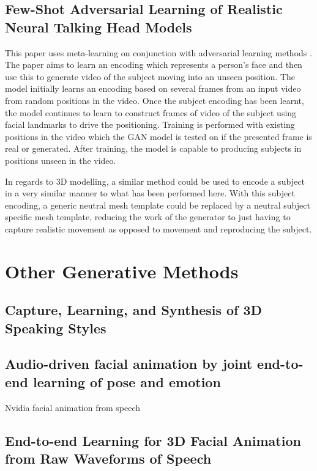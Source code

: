 \documentclass[12pt]{article}
\begin{document}
\subsection{Few-Shot Adversarial Learning of Realistic Neural Talking Head Models}
This paper uses meta-learning on conjunction with adversarial learning methods \cite{Zakharov2019}.
The paper aims to learn an encoding which represents a person's face and then use this to generate video of the subject moving into an unseen position.
The model initially learns an encoding based on several frames from an input video from random positions in the video.
Once the subject encoding has been learnt, the model continues to learn to construct frames of video of the subject using facial landmarks to drive the positioning.
Training is performed with existing positions in the video which the GAN model is tested on if the presented frame is real or generated.
After training, the model is capable to producing subjects in positions unseen in the video.

In regards to 3D modelling, a similar method could be used to encode a subject in a very similar manner to what has been performed here.
With this subject encoding, a generic neutral mesh template could be replaced by a neutral subject specific mesh template, reducing the work of the generator to just having to capture realistic movement as opposed to movement and reproducing the subject.

\section{Other Generative Methods}
\subsection{Capture, Learning, and Synthesis of {3D} Speaking Styles}
\cite{Cudeiro2019}

\subsection{Audio-driven facial animation by joint end-to-end learning of pose
and emotion}
Nvidia facial animation from speech \cite{Karras2017a}

\subsection{End-to-end Learning for 3D Facial Animation from Raw Waveforms of
Speech}
\cite{Pham2017}
\end{document}
